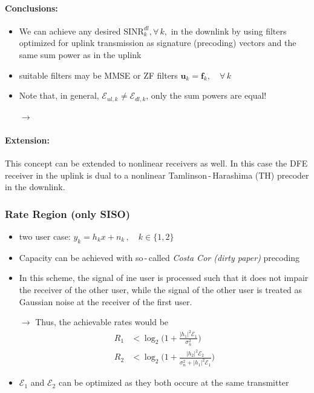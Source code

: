 \documentclass[a4paper, 10pt]{article}
\begin{document}
\paragraph{Conclusions:}
\begin{itemize}
	\item We can achieve any desired $\text{SINR}_k^{dl},\forall\, k,$ in the downlink by using filters optimized for uplink transmission as signature (precoding) vectors and the same sum power as in the uplink
	\item suitable filters may be MMSE or ZF filters $ \mathbf{u}_k = \mathbf{f}_k, \quad \forall \, k $
	\item Note that, in general, $\mathcal{E}_{ul,k} \neq \mathcal{E}_{dl,k} $, only the sum powers are equal!
	\item[$\rightarrow$] 
\end{itemize}
\paragraph{Extension:} This concept can be extended to nonlinear receivers as well. In this case the DFE receiver in the uplink is dual to a nonlinear Tamlinson\,-\,Harashima (TH) precoder in the downlink.

\subsubsection{Rate Region (only SISO)}
\begin{itemize}
	\item two user case: $ y_k = h_kx + n_k\,,\quad k \in \{1,2\} $
	\item Capacity can be achieved with so\,-\,called \textit{Costa Cor (dirty paper)} precoding
	\item In this scheme, the signal of ine user is processed such that it does not impair the receiver of the other user, while the signal of the other user is treated as Gaussian noise at the receiver of the first user.
	\item[$\rightarrow$] Thus, the achievable rates would be
	\begin{align*}
		R_1 &< \log_2\bigl(1 + \frac{|h_1|^2\mathcal{E}_1}{\sigma_n^2}\bigr)\\
		R_2 &< \log_2\bigl(1 + \frac{|h_2|^2\mathcal{E}_2}{\sigma_n^2 + |h_1|^2\mathcal{E}_1}\bigr)			
	\end{align*}	 
	\item $\mathcal{E}_1 $ and $\mathcal{E}_2 $ can be optimized as they both occure at the same transmitter
\end{itemize}
\end{document}
